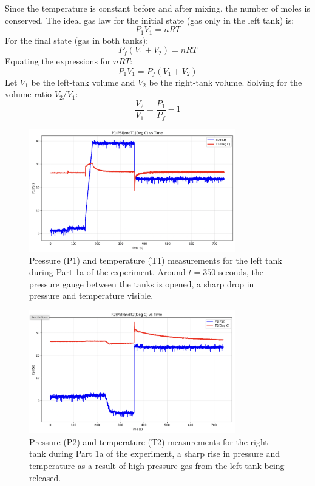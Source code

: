 \documentclass[12pt]{article}
\begin{document}
Since the temperature is constant before and after mixing, the number of moles is conserved. The ideal gas law for the initial state (gas only in the left tank) is:
\[ P_1 V_1 = n R T \]
For the final state (gas in both tanks):
\[ P_f (V_1 + V_2) = n R T \]
Equating the expressions for $nRT$:
\[ P_1 V_1 = P_f (V_1 + V_2) \]
Let $V_1$ be the left-tank volume and $V_2$ be the right-tank volume. Solving for the volume ratio $V_2/V_1$:
\[ \frac{V_2}{V_1} = \frac{P_1}{P_f} - 1 \]

\begin{figure}[h!]
\centering
\includegraphics[width=0.8\textwidth]{1a-left_tank.png}
\caption{Pressure (P1) and temperature (T1) measurements for the left tank during Part 1a of the experiment. Around $t = 350$ seconds, the pressure gauge between the tanks is opened, a sharp drop in pressure and temperature visible.}
\label{fig:tank1_data_a}
\end{figure}

\begin{figure}[h!]
\centering
\includegraphics[width=0.8\textwidth]{1a-right_tank.png}
\caption{Pressure (P2) and temperature (T2) measurements for the right tank during Part 1a of the experiment, a sharp rise in pressure and temperature as a result of high-pressure gas from the left tank being released.}
\label{fig:tank2_data_a}
\end{figure}
\end{document}
